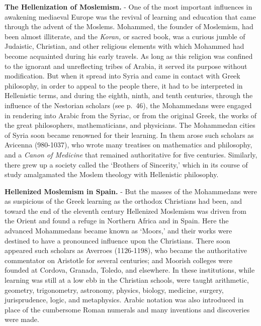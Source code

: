\documentclass[]{book}
\begin{document}
\textbf{The Hellenization of Moslemism.} - One of the most important influences in awakening mediaeval Europe was the revival of learning and education that came through the advent of the Moslems. Mohammed, the founder of Moslemism, had been almost illiterate, and the \emph{Koran,} or sacred book, was a curious jumble of Judaistic, Christian, and other religious elements with which Mohammed had become acquainted during his early travels. As long as this religion was confined to the ignorant and unreflecting tribes of Arabia, it served its purpose without modification. But when it spread into Syria and came in contact with Greek philosophy, in order to appeal to the people there, it had to be interpreted in Hellenistic terms, and during the eighth, ninth, and tenth centuries, through the influence of the Nestorian scholars (see p.~46), the Mohammedans were engaged in rendering into Arabic from the Syriac, or from the original Greek, the works of the great philosophers, mathematicians, and physicians. The Mohammedan cities of Syria soon became renowned for their learning. In them arose such scholars as Avicenna (980-1037), who wrote many treatises on mathematics and philosophy, and a \emph{Canon of Medicine} that remained authoritative for five centuries. Similarly, there grew up a society called the `Brothers of Sincerity,' which in its course of study amalgamated the Moslem theology with Hellenistic philosophy.

\textbf{Hellenized Moslemism in Spain.} - But the masses of the Mohammedans were as suspicious of the Greek learning as the orthodox Christians had been, and toward the end of the eleventh century Hellenized Moslemism was driven from the Orient and found a refuge in Northern Africa and in Spain. Here the advanced Mohammedans became known as `Moors,' and their works were destined to have a pronounced influence upon the Christians. There soon appeared such scholars as Averroes (1126-1198), who became the authoritative commentator on Aristotle for several centuries; and Moorish colleges were founded at Cordova, Granada, Toledo, and elsewhere. In these institutions, while learning was still at a low ebb in the Christian schools, were taught arithmetic, geometry, trigonometry, astronomy, physics, biology, medicine, surgery, jurisprudence, logic, and metaphysics. Arabic notation was also introduced in place of the cumbersome Roman numerals and many inventions and discoveries were made.
\end{document}
